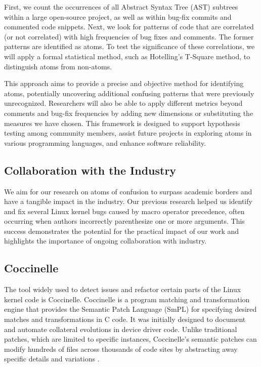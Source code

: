 \documentclass[conference]{IEEEtran}
\begin{document}
First, we count the occurrences of all Abstract Syntax Tree 
(AST) subtrees within a large open-source project, as well as 
within bug-fix commits and commented code snippets. Next, we 
look for patterns of code that are correlated (or not 
correlated) with high frequencies of bug fixes and comments. 
The former patterns are identified as atoms. To test the 
significance of these correlations, we will apply a formal 
statistical method, such as Hotelling’s T-Square method, to 
distinguish atoms from non-atoms.

This approach aims to provide a precise and objective method 
for identifying atoms, potentially uncovering additional 
confusing patterns that were previously unrecognized. 
Researchers will also be able to apply different metrics 
beyond comments and bug-fix frequencies by adding new 
dimensions or substituting the measures we have chosen. This 
framework is designed to support hypothesis testing among 
community members, assist future projects in exploring atoms 
in various programming languages, and enhance software 
reliability.


\subsection{Collaboration with the Industry}

We aim for our research on atoms of confusion to surpass 
academic borders and have a tangible impact in the industry. 
Our previous research helped us identify and fix several Linux kernel bugs caused by macro operator precedence, often occurring when authors incorrectly parenthesize one or more arguments. This success demonstrates 
the potential for the practical impact of our work and 
highlights the importance of ongoing collaboration with 
industry.

\subsection{Coccinelle}

The tool widely used to detect issues and refactor certain 
parts of the Linux kernel code is Coccinelle. Coccinelle is a 
program matching and transformation engine that provides the 
Semantic Patch Language (SmPL) for specifying desired matches 
and transformations in C code. It was initially designed to 
document and automate collateral evolutions in device driver 
code. Unlike traditional patches, which are limited to 
specific instances, Coccinelle's semantic patches can modify 
hundreds of files across thousands of code sites by 
abstracting away specific details and variations \cite{coccinelle}.
\end{document}
